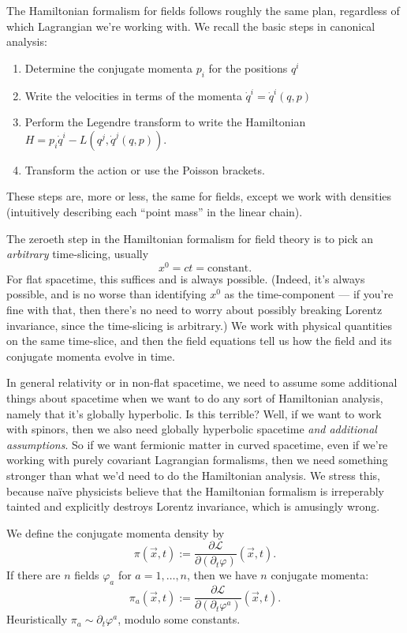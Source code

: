 \M
The Hamiltonian formalism for fields follows roughly the same plan,
regardless of which Lagrangian we're working with. We recall the basic
steps in canonical analysis:
\begin{enumerate}
\item Determine the conjugate momenta $p_{i}$ for the positions $q^{i}$
\item Write the velocities in terms of the momenta $\dot{q}^{i}=\dot{q}^{i}(q,p)$
\item Perform the Legendre transform to write the Hamiltonian $H=p_{i}\dot{q}^{i}-L(q^{j},\dot{q}^{j}(q,p))$.
\item Transform the action or use the Poisson brackets.
\end{enumerate}
These steps are, more or less, the same for fields, except we work with
densities (intuitively describing each ``point mass'' in the linear chain). 

The zeroeth step in the Hamiltonian formalism for field theory is to
pick an \emph{arbitrary} time-slicing, usually
\begin{equation}
x^{0}=ct=\mbox{constant}.
\end{equation}
For flat spacetime, this suffices and is always possible. (Indeed, it's
always possible, and is no worse than identifying $x^{0}$ as the
time-component --- if you're fine with that, then there's no need to
worry about possibly breaking Lorentz invariance, since the time-slicing
is arbitrary.) We work with physical quantities on the same time-slice,
and then the field equations tell us how the field and its conjugate
momenta evolve in time.

\begin{ddanger}
In general relativity or in non-flat spacetime, we need to assume some
additional things about spacetime when we want to do any sort of
Hamiltonian analysis, namely that it's globally hyperbolic. Is this
terrible? Well, if we want to work with spinors, then we also need
globally hyperbolic spacetime \emph{and additional assumptions}. So if
we want fermionic matter in curved spacetime, even if we're working with
purely covariant Lagrangian formalisms, then we need something stronger
than what we'd need to do the Hamiltonian analysis. We stress this,
because na\"{i}ve physicists believe that the Hamiltonian formalism is
irreperably tainted and explicitly destroys Lorentz invariance, which is
amusingly wrong.
\end{ddanger}

We define the conjugate momenta density by
\begin{equation}
\pi(\vec{x},t) := \frac{\partial\mathcal{L}}{\partial(\partial_{t}\varphi)}(\vec{x},t).
\end{equation}
If there are $n$ fields $\varphi_{a}$ for $a=1,\dots,n$, then we have
$n$ conjugate momenta:
\begin{equation}
\pi_{a}(\vec{x},t) := \frac{\partial\mathcal{L}}{\partial(\partial_{t}\varphi^{a})}(\vec{x},t).
\end{equation}
Heuristically $\pi_{a}\sim\partial_{t}\varphi^{a}$, modulo some constants.

